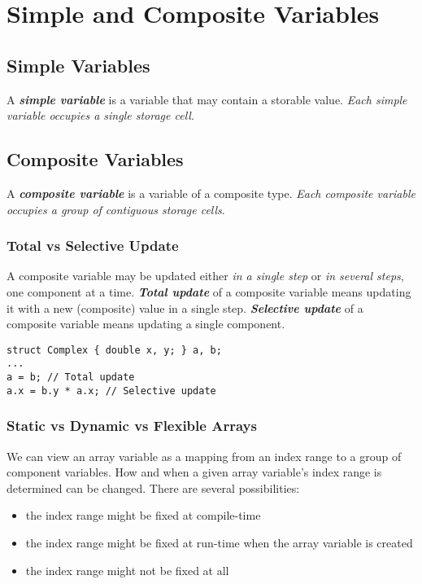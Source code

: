 \section{Simple and Composite Variables}

\subsection{Simple Variables}

A \textit{\textbf{simple variable}} is a variable that may contain a storable value. \textit{Each simple variable occupies a single storage cell}.

\subsection{Composite Variables}

A \textit{\textbf{composite variable}} is a variable of a composite type. \textit{Each composite variable occupies a group of contiguous storage cells}.

\subsubsection{Total vs Selective Update}

A composite variable may be updated either \textit{in a single step} or \textit{in several steps}, one component at a time. \textit{\textbf{Total update}} of a composite variable means updating it with a new (composite) value in a single step. \textit{\textbf{Selective update}} of a composite variable means updating a single component.

\begin{listing}[H]
\begin{verbatim}
struct Complex { double x, y; } a, b;
...
a = b; // Total update
a.x = b.y * a.x; // Selective update
\end{verbatim}
\caption{}
\label{code:code-2}
\end{listing}

\subsubsection{Static vs Dynamic vs Flexible Arrays}

We can view an array variable as a mapping from an index range to a group of component variables. How and when a given array variable's index range is determined can be changed. There are several possibilities:
\begin{itemize}
  \item the index range might be fixed at compile-time
  \item the index range might be fixed at run-time when the array variable is created
  \item the index range might not be fixed at all
\end{itemize}

